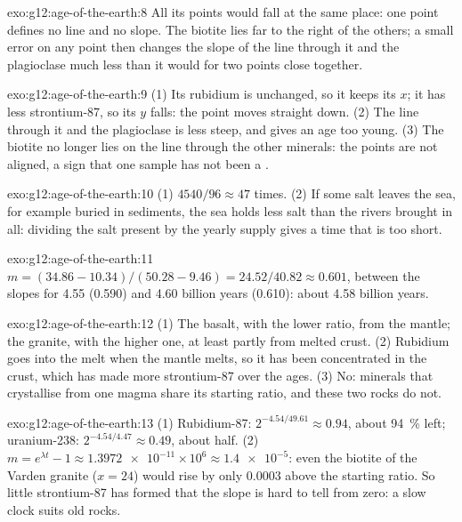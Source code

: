 \begin{solution}{exo:g12:age-of-the-earth:8}
All its points would fall at the same place: one point defines no line and
no slope. The biotite lies far to the right of the others; a small error on
any point then changes the slope of the line through it and the plagioclase
much less than it would for two points close together.
\end{solution}

\begin{solution}{exo:g12:age-of-the-earth:9}
(1) Its rubidium is unchanged, so it keeps its $x$; it has less
strontium-87, so its $y$ falls: the point moves straight down. (2) The line
through it and the plagioclase is less steep, and gives an age too young.
(3) The biotite no longer lies on the line through the other minerals: the
points are not aligned, a sign that one sample has not been a .
\end{solution}

\begin{solution}{exo:g12:age-of-the-earth:10}
(1) $4540/96 \approx 47$ times. (2) If some salt leaves the sea, for example
buried in sediments, the sea holds less salt than the rivers brought in all:
dividing the salt present by the yearly supply gives a time that is too
short.
\end{solution}

\begin{solution}{exo:g12:age-of-the-earth:11}
$m = (34.86 - 10.34)/(50.28 - 9.46) = 24.52/40.82 \approx 0.601$, between
the slopes for 4.55 (0.590) and 4.60 billion years (0.610): about 4.58
billion years.
\end{solution}

\begin{solution}{exo:g12:age-of-the-earth:12}
(1) The basalt, with the lower ratio, from the mantle; the granite, with the
higher one, at least partly from melted crust. (2) Rubidium goes into the
melt when the mantle melts, so it has been concentrated in the crust, which
has made more strontium-87 over the ages. (3) No: minerals that crystallise
from one magma share its starting ratio, and these two rocks do not.
\end{solution}

\begin{solution}{exo:g12:age-of-the-earth:13}
(1) Rubidium-87: $2^{-4.54/49.61} \approx 0.94$, about \qty{94}{\percent}
left; uranium-238: $2^{-4.54/4.47} \approx 0.49$, about half. (2) $m =
e^{\lambda t} - 1 \approx \num{1.3972e-11} \times 10^6 \approx
\num{1.4e-5}$: even the biotite of the Varden granite ($x = 24$) would rise
by only $0.0003$ above the starting ratio. So little strontium-87 has formed
that the slope is hard to tell from zero: a slow clock suits old rocks.
\end{solution}

